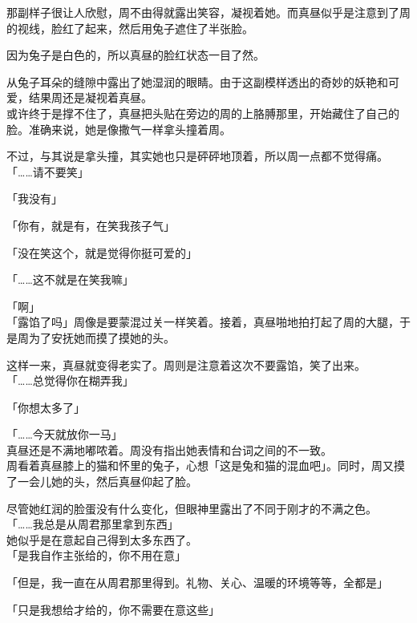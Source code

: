 那副样子很让人欣慰，周不由得就露出笑容，凝视着她。而真昼似乎是注意到了周的视线，脸红了起来，然后用兔子遮住了半张脸。

因为兔子是白色的，所以真昼的脸红状态一目了然。

从兔子耳朵的缝隙中露出了她湿润的眼睛。由于这副模样透出的奇妙的妖艳和可爱，结果周还是凝视着真昼。\\

或许终于是撑不住了，真昼把头贴在旁边的周的上胳膊那里，开始藏住了自己的脸。准确来说，她是像撒气一样拿头撞着周。

不过，与其说是拿头撞，其实她也只是砰砰地顶着，所以周一点都不觉得痛。\\

「……请不要笑」

「我没有」

「你有，就是有，在笑我孩子气」

「没在笑这个，就是觉得你挺可爱的」

「……这不就是在笑我嘛」

「啊」\\

「露馅了吗」周像是要蒙混过关一样笑着。接着，真昼啪地拍打起了周的大腿，于是周为了安抚她而摸了摸她的头。

这样一来，真昼就变得老实了。周则是注意着这次不要露馅，笑了出来。\\

「……总觉得你在糊弄我」

「你想太多了」

「……今天就放你一马」\\

真昼还是不满地嘟哝着。周没有指出她表情和台词之间的不一致。\\

周看着真昼膝上的猫和怀里的兔子，心想「这是兔和猫的混血吧」。同时，周又摸了一会儿她的头，然后真昼仰起了脸。

尽管她红润的脸蛋没有什么变化，但眼神里露出了不同于刚才的不满之色。\\

「……我总是从周君那里拿到东西」\\

她似乎是在意起自己得到太多东西了。\\

「是我自作主张给的，你不用在意」

「但是，我一直在从周君那里得到。礼物、关心、温暖的环境等等，全都是」

「只是我想给才给的，你不需要在意这些」\\

